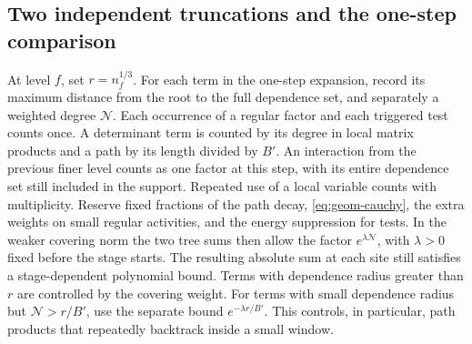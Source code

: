 \documentclass[11pt,a4paper]{article}
\numberwithin{equation}{section}
\begin{document}
\subsection{Two independent truncations and the one-step comparison}

At level \(f\), set \(r=n_f^{1/3}\). For each term in the one-step expansion, record its maximum distance from the root to the full dependence set, and separately a weighted degree \(\mathcal N\). Each occurrence of a regular factor and each triggered test counts once. A determinant term is counted by its degree in local matrix products and a path by its length divided by \(B'\). An interaction from the previous finer level counts as one factor at this step, with its entire dependence set still included in the support. Repeated use of a local variable counts with multiplicity. Reserve fixed fractions of the path decay, \eqref{eq:geom-cauchy}, the extra weights on small regular activities, and the energy suppression for tests. In the weaker covering norm the two tree sums then allow the factor \(e^{\lambda\mathcal N}\), with \(\lambda>0\) fixed before the stage starts. The resulting absolute sum at each site still satisfies a stage-dependent polynomial bound. Terms with dependence radius greater than \(r\) are controlled by the covering weight. For terms with small dependence radius but \(\mathcal N>r/B'\), use the separate bound \(e^{-\lambda r/B'}\). This controls, in particular, path products that repeatedly backtrack inside a small window.
\end{document}
